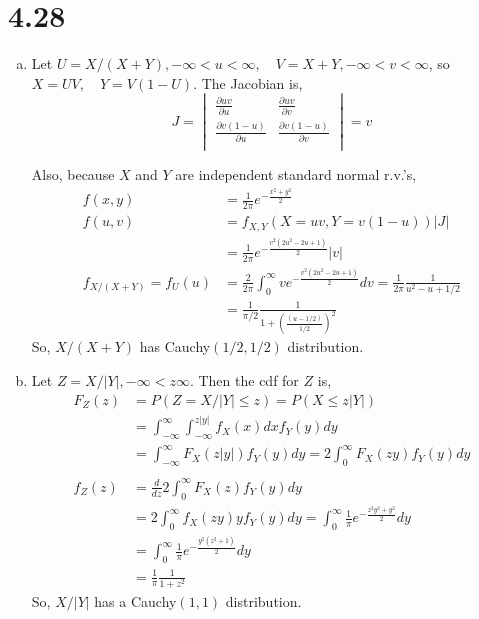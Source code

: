 \documentclass[letterpaper]{article}
\newcommand{\intii}{\int_{-\infty}^\infty}
\newcommand{\intzi}{\int_0^\infty}
\begin{document}
    \section*{4.28}
    \begin{enumerate}[(a)]
    \item
    Let $U = X/(X+Y), -\infty < u < \infty, \quad V=X+Y, -\infty < v < \infty$, so $X = UV, \quad Y=V(1-U)$.
    The Jacobian is,
    \[
    J = \begin{vmatrix}
    \frac{\partial uv}{\partial u} & \frac{\partial uv}{\partial v} \\
    \frac{\partial v(1-u)}{\partial u} & \frac{\partial v(1-u)}{\partial v} \\
    \end{vmatrix} = v
    \]

    Also, because $X$ and $Y$ are independent standard normal r.v.'s, 
    \begin{align*}
    f(x,y) & = \frac{1}{2\pi} e^{-\frac{x^2+y^2}{2}} \\
    f(u,v) & = f_{X,Y}(X=uv, Y=v(1-u))|J| \\
    & = \frac{1}{2\pi}e^{-\frac{v^2(2u^2-2u+1)}{2}}|v| \\
    f_{X/(X+Y)} = f_U(u) & = \frac{2}{2\pi} \intzi ve^{-\frac{v^2(2u^2-2u+1)}{2}} dv = \frac{1}{2\pi} \frac{1}{u^2-u+1/2} \\
    & = \frac{1}{\pi/2} \frac{1}{1+\left(\frac{(u-1/2)}{1/2}\right)^2}
    \end{align*}
    So, $X/(X+Y)$ has Cauchy$(1/2, 1/2)$ distribution.
    \item Let $Z = X/|Y|, -\infty < z \infty$. Then the cdf for $Z$ is,
    \begin{align*}
    F_Z(z) & = P(Z = X/|Y| \le z) = P(X \le z|Y|) \\
    & = \intii \int_{-\infty}^{z|y|} f_{X} (x) dx f_Y(y) dy \\
    & = \intii F_X(z|y|) f_Y(y) dy = 2 \intzi F_X(zy) f_Y(y) dy \\
    \\
    f_Z(z) & = \frac{d}{dz} 2 \intzi F_X(z) f_Y(y) dy \\
    & = 2 \intzi f_X(zy) y f_Y(y) dy 
    = \intzi \frac{1}{\pi} e^{-\frac{z^2y^2+y^2}{2}} dy \\
    & = \intzi \frac{1}{\pi} e^{-\frac{y^2(z^2+1)}{2}} dy \\
    & = \frac{1}{\pi}\frac{1}{1+z^2}
    \end{align*}
    So, $X/|Y|$ has a Cauchy$(1,1)$ distribution.
    \end{enumerate}
\end{document}
